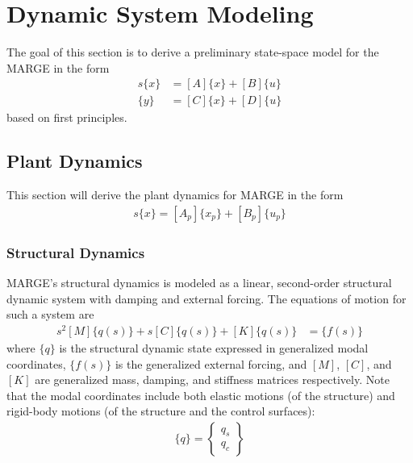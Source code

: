\chapter{Dynamic System Modeling}
\label{ch:sysModeling}

The goal of this section is to derive a preliminary state-space model for the MARGE in the form
\begin{equation}
\label{eq:modelingGoal}
	\begin{aligned}
    		s \{x\} &= [A] \{x\} + [B]\{u\} \\
	    \{y\} &= [C] \{x\} + [D] \{u\}
	\end{aligned}
\end{equation}
based on first principles.

\section{Plant Dynamics}

This section will derive the plant dynamics for MARGE in the form
\begin{align}
	\label{eq:ssPlant}
	s \{x\} = [A_p]\{x_p\}+[B_p]\{u_p\}
\end{align}

\subsection{Structural Dynamics}

MARGE's structural dynamics is modeled as a linear, second-order structural dynamic system with damping and external forcing. The equations of motion for such a system are
\begin{align}
    s^2 [M] \{q(s)\} + s [C] \{q(s)\} + [K] \{q(s)\} &= \{f(s)\}
\end{align}
where $\{q\}$ is the structural dynamic state expressed in generalized modal coordinates, $\{f(s)\}$ is the generalized external forcing, and $[M]$, $[C]$, and $[K]$ are generalized mass, damping, and stiffness matrices respectively. Note that the modal coordinates include both elastic motions (of the structure) and rigid-body motions (of the structure and the control surfaces):
\begin{align}
    \{q\} = \begin{Bmatrix} q_{s} \\ q_{c} \end{Bmatrix}
\end{align}

